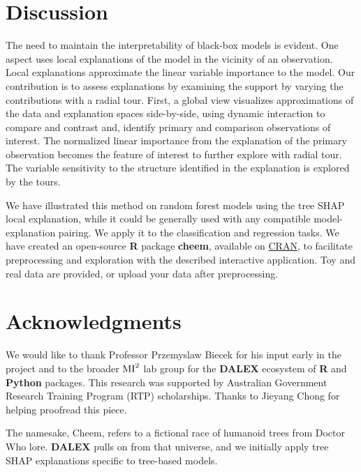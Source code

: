 \documentclass[
  article]{article}
\begin{document}
\hypertarget{sec:discussion}{%
\section{Discussion}\label{sec:discussion}}

The need to maintain the interpretability of black-box models is evident. One aspect uses local explanations of the model in the vicinity of an observation. Local explanations approximate the linear variable importance to the model. Our contribution is to assess explanations by examining the support by varying the contributions with a radial tour. First, a global view visualizes approximations of the data and explanation spaces side-by-side, using dynamic interaction to compare and contrast and, identify primary and comparison observations of interest. The normalized linear importance from the explanation of the primary observation becomes the feature of interest to further explore with radial tour. The variable sensitivity to the structure identified in the explanation is explored by the tours.

We have illustrated this method on random forest models using the tree SHAP local explanation, while it could be generally used with any compatible model-explanation pairing. We apply it to the classification and regression tasks. We have created an open-source \textbf{R} package \textbf{cheem}, available on \href{https://CRAN.R-project.org/package=cheem}{CRAN}, to facilitate preprocessing and exploration with the described interactive application. Toy and real data are provided, or upload your data after preprocessing.

\hypertarget{acknowledgments}{%
\section{Acknowledgments}\label{acknowledgments}}

We would like to thank Professor Przemyslaw Biecek for his input early in the project and to the broader \(\text{MI}^\text2\) lab group for the \textbf{DALEX} ecosystem of \textbf{R} and \textbf{Python} packages. This research was supported by Australian Government Research Training Program (RTP) scholarships. Thanks to Jieyang Chong for helping proofread this piece.

The namesake, Cheem, refers to a fictional race of humanoid trees from Doctor Who lore. \textbf{DALEX} pulls on from that universe, and we initially apply tree SHAP explanations specific to tree-based models.
\end{document}
